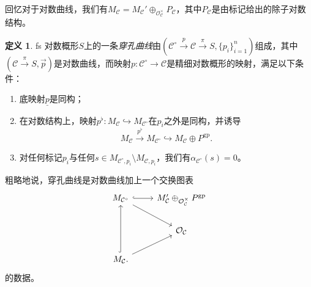 \documentclass{amsart}
\theoremstyle{definition}
\newtheorem{defn}[thm]{定义}
\theoremstyle{remark}
\theoremstyle{plain}
\theoremstyle{definition}
\theoremstyle{remark}
\newcommand{\mc}[1]{\mathcal{#1}}
\newcommand{\mr}[1]{\mathrm{#1}}
\newcommand{\on}[1]{\operatorname{#1}}
\newcommand{\ul}[1]{\underline{#1}}
\newcommand{\1}{\mathbf{1}}
\newcommand{\2}{\mathbf{2}}
\newcommand{\3}{\mathbf{3}}
\begin{document}
回忆对于对数曲线，我们有\(M_{\mc{C}} = M_{\mc{C}}' \oplus_{\mc{O}_{\mc{C}}^{\times}} P_{\mc{C}}\)，其中\(P_{\mc{C}}\)是由标记给出的除子对数结构。

\begin{defn}
    fs 对数概形\(S\)上的一条\textit{穿孔曲线}由\((\mc{C}^{\circ} \xrightarrow{p} \mc{C} \xrightarrow{\pi} S, \{p_i\}_{i=1}^n)\)组成，其中\((\mc{C} \xrightarrow{\pi} S, \vec{p})\)是对数曲线，而映射\(p \colon \mc{C}^{\circ} \to \mc{C}\)是精细对数概形的映射，满足以下条件：
    \begin{enumerate}
        \item 底映射\(\ul{p}\)是同构；
        \item 在对数结构上，映射\(p^{\flat} \colon M_{\mc{C}} \hookrightarrow M_{\mc{C}^{\circ}}\)在\(p_i\)之外是同构，并诱导
            \[ M_{\mc{C}} \xrightarrow{p^{\flat}} M_{\mc{C}^{\circ}} \hookrightarrow M_{\mc{C}} \oplus P^{\mr{gp}}. \]
        \item 对任何标记\(p_i\)与任何\(s \in M_{\mc{C}^{\circ}, p_i} \setminus M_{\mc{C}, p_i}\)，我们有\(\alpha_{\mc{C}^{\circ}}(s) = 0\)。
    \end{enumerate}
\end{defn}

粗略地说，穿孔曲线是对数曲线加上一个交换图表
\begin{equation*}
\begin{tikzcd}
    M_{\mc{C}^{\circ}} \ar{dr} \ar[hookrightarrow]{r} & M_{\mc{C}}' \oplus_{\mc{O}_{\mc{C}}^{\times}} P^{\on{gp}} \\
    & \mc{O}_{\mc{C}} \\
    M_{\mc{C}} \ar[hookrightarrow]{uu} \ar{ur}.
\end{tikzcd}
\end{equation*}
的数据。
\end{document}
